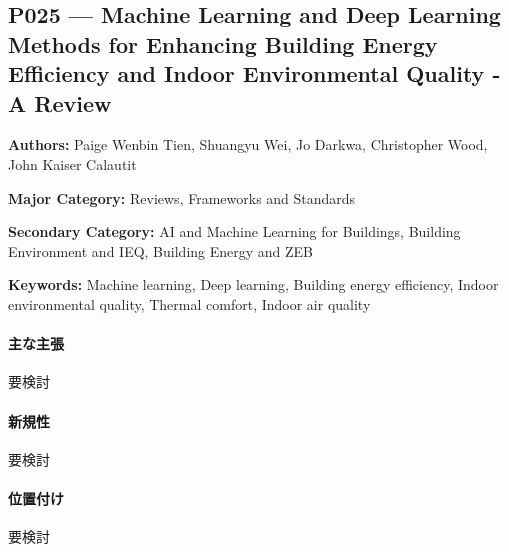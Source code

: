 \subsection{P025 --- Machine Learning and Deep Learning Methods for Enhancing Building Energy Efficiency and Indoor Environmental Quality - A Review}
\label{paper:P025}
\textbf{Authors:} Paige Wenbin Tien, Shuangyu Wei, Jo Darkwa, Christopher Wood, John Kaiser Calautit\par
\textbf{Major Category:} Reviews, Frameworks and Standards\par
\textbf{Secondary Category:} AI and Machine Learning for Buildings, Building Environment and IEQ, Building Energy and ZEB\par
\textbf{Keywords:} Machine learning, Deep learning, Building energy efficiency, Indoor environmental quality, Thermal comfort, Indoor air quality\par
\paragraph{主な主張}
要検討 \cite{Tien:2022MLDLEnergyIEQReview}
\paragraph{新規性}
要検討
\paragraph{位置付け}
要検討
